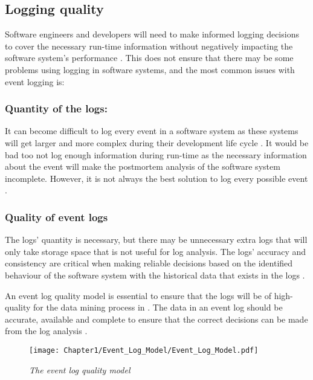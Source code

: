 \subsection{Logging quality}\label{sec:ch1_loggingQuality}

Software engineers and developers will need to make informed logging decisions to cover the necessary run-time information without negatively impacting the software system's performance \cite{Zhu2015,Zhu2019,Kherbouche2017}. This does not ensure that there may be some problems using logging in software systems, and the most common issues with event logging is:

\subsubsection{Quantity of the logs:} 
It can become difficult to log every event in a software system as these systems will get larger and more complex during their development life cycle \cite{Stojanov2017}. It would be bad too not log enough information during run-time as the necessary information about the event will make the postmortem analysis of the software system incomplete. However, it is not always the best solution to log every possible event \cite{Zhu2015, Jans2012}.

\subsubsection{Quality of event logs} 
The logs' quantity is necessary, but there may be unnecessary extra logs that will only take storage space that is not useful for log analysis. The logs' accuracy and consistency are critical when making reliable decisions based on the identified behaviour of the software system with the historical data that exists in the logs \cite{Stojanov2017,Kherbouche2017}.\par An event log quality model is essential to ensure that the logs will be of high-quality for the data mining process in . The data in an event log should be accurate, available and complete to ensure that the correct decisions can be made from the log analysis \cite{Kherbouche2017, VanDerAalst2011}.

\begin{figure}[!htb] %
	\centering %
	\texttt{[image: Chapter1/Event\_Log\_Model/Event\_Log\_Model.pdf]}
	\caption[The event log quality model]
	{\textit{The event log quality model \cite{Kherbouche2017}}} \label{fig:EventQModel}
\end{figure}

